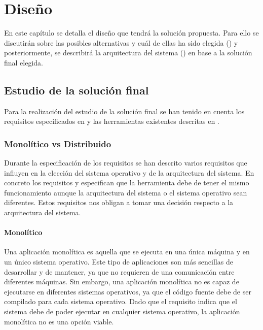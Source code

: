 \chapter{Diseño}\label{chap:diseno}

En este capítulo se detalla el diseño que tendrá la solución propuesta. Para ello se discutirán sobre las posibles alternativas y cuál de ellas ha sido elegida () y posteriormente, se describirá la arquitectura del sistema () en base a la solución final elegida.

\section{Estudio de la solución final}\label{sec:estudio-solucion-final}

Para la realización del estudio de la solución final se han tenido en cuenta los requisitos especificados en  y las herramientas existentes descritas en . 

\subsection{Monolítico vs Distribuido} \label{subsec:monolitico-vs-distribuido}

Durante la especificación de los requisitos se han descrito varios requisitos que influyen en la elección del sistema operativo y de la arquitectura del sistema. En concreto los requisitos  y  especifican que la herramienta debe de tener el mismo funcionamiento aunque la arquitectura del sistema o el sistema operativo sean diferentes. Estos requisitos nos obligan a tomar una decisión respecto a la arquitectura del sistema. 

\subsubsection{Monolítico} \label{subsubsec:monolitico}

Una \gls{aplicación monolítica} es aquella que se ejecuta en una única máquina y en un único sistema operativo. Este tipo de aplicaciones son más sencillas de desarrollar y de mantener, ya que no requieren de una comunicación entre diferentes máquinas. Sin embargo, una \gls{aplicación monolítica} no es capaz de ejecutarse en diferentes sistemas operativos, ya que el código fuente debe de ser compilado para cada sistema operativo. Dado que el requisito  indica que el sistema debe de poder ejecutar en cualquier sistema operativo, la \gls{aplicación monolítica} no es una opción viable.

